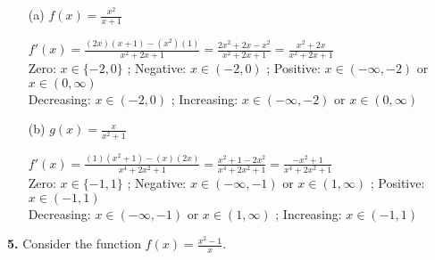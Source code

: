 \documentclass[12pt]{article}
\begin{document}
\begin{enumerate}
\item[(a)] $f(x) = \frac{x^2}{x + 1}$
\\[8pt]
\begin{minipage}[t][3cm][t]{\linewidth}
    $\displaystyle f'(x) = \frac{(2x)(x+1) - (x^2)(1)}{x^2+2x+1} = \frac{2x^2+2x-x^2}{x^2+2x+1} = \frac{x^2+2x}{x^2+2x+1}$
    \\[8pt] Zero: $x \in \{-2, 0\}$ ; Negative: $x \in (-2, 0)$ ; Positive: $x \in (-\infty, -2)$ or $x \in (0, \infty)$
    \\[8pt] Decreasing: $x \in (-2, 0)$ ; Increasing: $x \in (-\infty, -2)$ or $x \in (0, \infty)$
\end{minipage}

\item[(b)] $g(x) = \frac{x}{x^2 + 1}$
\\[8pt]
\begin{minipage}[t][3cm][t]{\linewidth}
    $\displaystyle f'(x) = \frac{(1)(x^2+1) - (x)(2x)}{x^4+2x^2+1} = \frac{x^2+1-2x^2}{x^4+2x^2+1} = \frac{-x^2+1}{x^4+2x^2+1}$
    \\[8pt] Zero: $x \in \{-1, 1\}$ ; Negative: $x \in (-\infty, -1)$ or $x \in (1, \infty)$ ; Positive: $x \in (-1, 1)$
    \\[8pt] Decreasing: $x \in (-\infty, -1)$ or $x \in (1, \infty)$ ; Increasing: $x \in (-1, 1)$
\end{minipage}
\end{enumerate}

\newpage

\textbf{5.} Consider the function $f(x) = \frac{x^2 - 1}{x}$.
\end{document}
